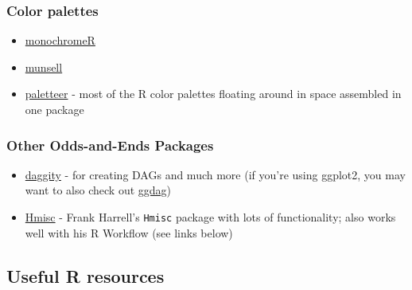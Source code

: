 \documentclass[
  letterpaper,
  DIV=11,
  numbers=noendperiod]{scrreprt}
\begin{document}
\hypertarget{color-palettes}{%
\subsubsection*{Color palettes}\label{color-palettes}}

\begin{itemize}
\item
  \href{https://github.com/cararthompson/monochromeR}{monochromeR}
\item
  \href{https://github.com/cwickham/munsell/}{munsell}
\item
  \href{https://github.com/EmilHvitfeldt/paletteer}{paletteer} - most of
  the R color palettes floating around in space assembled in one package
\end{itemize}

\hypertarget{other-odds-and-ends-packages}{%
\subsubsection*{Other Odds-and-Ends
Packages}\label{other-odds-and-ends-packages}}

\begin{itemize}
\item
  \href{http://www.dagitty.net/primer/}{daggity} - for creating DAGs and
  much more (if you're using ggplot2, you may want to also check out
  \href{https://ggdag.malco.io/}{ggdag})
\item
  \href{https://hbiostat.org/R/Hmisc/}{Hmisc} - Frank Harrell's
  \texttt{Hmisc} package with lots of functionality; also works well
  with his R Workflow (see links below)
\end{itemize}

\hypertarget{useful-r-resources}{%
\subsection{Useful R resources}\label{useful-r-resources}}
\end{document}
